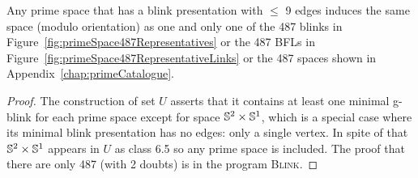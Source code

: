 \begin{Theo}
\label{theo:primeSpacesUpTo9Edges}
Any prime space that has a blink presentation with $\leq$ 9 edges induces the
same space (modulo orientation) as one and only one of the 487 blinks in
Figure~\ref{fig:primeSpace487Representatives} or the 487 BFLs in
Figure~\ref{fig:primeSpace487RepresentativeLinks} or the 487 spaces shown
in Appendix~\ref{chap:primeCatalogue}.
\end{Theo}

\enlargethispage{2cm}

\begin{proof}
The construction of set $U$ asserts that it contains at least one minimal
g-blink for each prime space except for space $\mathbb{S}^2 \times \mathbb{S}^1$,
which is a special case where its minimal blink presentation
has no edges: only a single vertex. In spite of that $\mathbb{S}^2 \times \mathbb{S}^1$
appears in $U$ as class 6.5 so any prime space is included. The proof
that there are only 487 (with 2 doubts) is in the program \textsc{Blink}.
\end{proof}



\newpage

